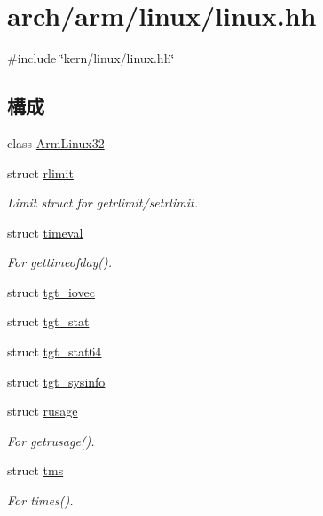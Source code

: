 \hypertarget{arch_2arm_2linux_2linux_8hh}{
\section{arch/arm/linux/linux.hh}
\label{arch_2arm_2linux_2linux_8hh}
}
{\ttfamily \#include \char`\"{}kern/linux/linux.hh\char`\"{}}\par
\subsection*{構成}
\begin{DoxyCompactItemize}
\item 
class \hyperlink{classArmLinux32}{ArmLinux32}
\item 
struct \hyperlink{structArmLinux32_1_1rlimit}{rlimit}
\begin{DoxyCompactList}\small\item\em Limit struct for getrlimit/setrlimit. \item\end{DoxyCompactList}\item 
struct \hyperlink{structArmLinux32_1_1timeval}{timeval}
\begin{DoxyCompactList}\small\item\em For gettimeofday(). \item\end{DoxyCompactList}\item 
struct \hyperlink{structArmLinux32_1_1tgt__iovec}{tgt\_\-iovec}
\item 
struct \hyperlink{structArmLinux32_1_1tgt__stat}{tgt\_\-stat}
\item 
struct \hyperlink{structArmLinux32_1_1tgt__stat64}{tgt\_\-stat64}
\item 
struct \hyperlink{structArmLinux32_1_1tgt__sysinfo}{tgt\_\-sysinfo}
\item 
struct \hyperlink{structArmLinux32_1_1rusage}{rusage}
\begin{DoxyCompactList}\small\item\em For getrusage(). \item\end{DoxyCompactList}\item 
struct \hyperlink{structArmLinux32_1_1tms}{tms}
\begin{DoxyCompactList}\small\item\em For times(). \item\end{DoxyCompactList}\item 

\end{DoxyCompactItemize}
